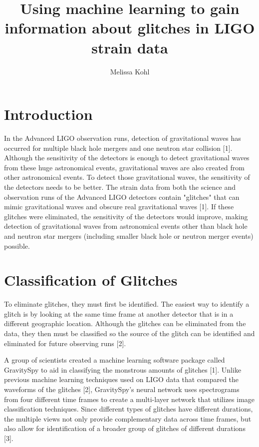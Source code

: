 \documentclass[a4paper]{article}
\title{Using machine learning to gain information about glitches in LIGO strain data}
\author{Melissa Kohl}
\begin{document}
\maketitle

\section{Introduction}

In the Advanced LIGO observation runs, detection of gravitational waves has occurred for multiple black hole mergers and one neutron star collision [1]. Although the sensitivity of the detectors is enough to detect gravitational waves from these huge astronomical events, gravitational waves are also created from other astronomical events. To detect those gravitational waves, the sensitivity of the detectors needs to be better. The strain data from both the science and observation runs of the Advanced LIGO detectors contain "glitches" that can mimic gravitational waves and obscure real gravitational waves [1]. If these glitches were eliminated, the sensitivity of the detectors would improve, making detection of gravitational waves from astronomical events other than black hole and neutron star mergers (including smaller black hole or neutron merger events) possible. 

\section{Classification of Glitches}

To eliminate glitches, they must first be identified. The easiest way to identify a glitch is by looking at the same time frame at another detector that is in a different geographic location. Although the glitches can be eliminated from the data, they then must be classified so the source of the glitch can be identified and eliminated for future observing runs [2]. 

A group of scientists created a machine learning software package called GravitySpy to aid in classifying the monstrous amounts of glitches [1]. Unlike previous machine learning techniques used on LIGO data that compared the waveforms of the glitches [2], GravitySpy's neural network uses spectrograms from four different time frames to create a multi-layer network that utilizes image classification techniques. Since different types of glitches have different durations, the multiple views not only provide complementary data across time frames, but also allow for identification of a broader group of glitches of different durations [3].  
\end{document}
